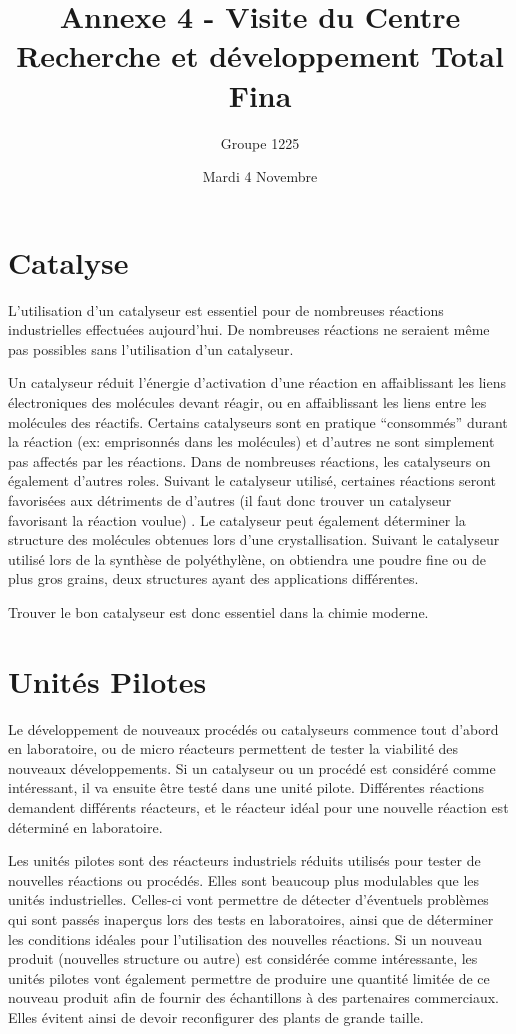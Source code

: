 \documentclass[12pt,oneside]{article}
\title{Annexe 4 - Visite du Centre Recherche et développement Total Fina}
\author{Groupe 1225}
\date{Mardi 4 Novembre}
\begin{document}
\maketitle
 
 \section{Catalyse}
 
 L'utilisation d'un catalyseur est essentiel pour de nombreuses réactions industrielles effectuées aujourd'hui. De nombreuses
 réactions ne seraient même pas possibles sans l'utilisation d'un catalyseur.
 
 Un catalyseur réduit l'énergie d'activation d'une réaction en affaiblissant les liens électroniques des molécules devant 
 réagir, ou en affaiblissant les liens entre les molécules des réactifs. Certains catalyseurs sont en pratique ``consommés'' 
 durant la réaction (ex: emprisonnés dans les molécules) et d'autres ne sont simplement pas affectés par les réactions. 
 Dans de nombreuses réactions, les catalyseurs on également d'autres roles. Suivant le catalyseur utilisé, certaines 
 réactions seront favorisées aux détriments de d'autres (il faut donc trouver un catalyseur favorisant la réaction voulue)
 . Le catalyseur peut également déterminer la structure des molécules obtenues lors d'une crystallisation. Suivant le catalyseur
 utilisé lors de la synthèse de polyéthylène, on obtiendra une poudre fine ou de plus gros grains, deux structures ayant des
 applications différentes.
 
 Trouver le bon catalyseur est donc essentiel dans la chimie moderne.
 
 \section{Unités Pilotes}
 
 Le développement de nouveaux procédés ou catalyseurs commence tout d'abord en laboratoire, ou de micro réacteurs permettent de tester la viabilité 
 des nouveaux développements. Si un catalyseur ou un procédé est considéré comme intéressant, il va ensuite être testé dans une unité pilote. 
 Différentes réactions demandent différents réacteurs, et le réacteur idéal pour une nouvelle réaction est déterminé en laboratoire.
 
 Les unités pilotes sont des réacteurs industriels réduits utilisés pour tester de nouvelles réactions ou procédés. Elles sont beaucoup plus modulables
 que les unités industrielles. Celles-ci vont permettre de détecter d'éventuels problèmes qui sont passés inaperçus lors des tests en laboratoires, 
 ainsi que de déterminer les conditions idéales pour l'utilisation des nouvelles réactions. Si un nouveau produit (nouvelles structure ou autre) est
 considérée comme intéressante, les unités pilotes vont également permettre de produire une quantité limitée de ce nouveau produit afin de fournir
 des échantillons à des partenaires commerciaux. Elles évitent ainsi de devoir reconfigurer des plants de grande taille.
 
\end{document}
